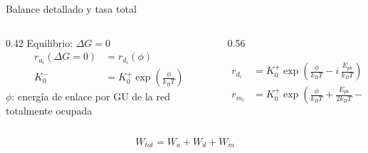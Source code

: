 \documentclass[aspectratio=169,11pt]{beamer}
\newcommand{\kB}{k_{B}}
\begin{document}
\begin{frame}{Balance detallado y tasa total}
  \begin{columns}[c,onlytextwidth]
    \begin{column}{0.42\textwidth}
      \small
      {\color{azul}Equilibrio: $\Delta G = 0$}
      \begin{align}
        r_{a_i}(\Delta G = 0) &= r_{d_i}(\phi) \tag{13}\\[0.3em]
        K_0^{-} &= K_0^{+}\exp\!\left(\frac{\phi}{\kB T}\right) \tag{14}
      \end{align}
      \vspace{0.3em}
      {\footnotesize $\phi$: energía de enlace por GU de la red totalmente ocupada}
    \end{column}
    \begin{column}{0.56\textwidth}
      \small
      \begin{block}{}
        \begin{align}
          r_{d_i} &= K_0^{+}\exp\!\left(\frac{\phi}{\kB T} - i\,\frac{E_{pb}}{\kB T}\right) \tag{15}\\[0.3em]
          r_{m_i} &= K_0^{+}\exp\!\left(\frac{\phi}{\kB T} + \frac{E_{pb}}{2\kB T} - i\,\frac{E_{pb}}{\kB T}\right) \tag{16}
        \end{align}
      \end{block}
    \end{column}
  \end{columns}
  \vspace{0.8em}
  \begin{block}{}
    \begin{equation}
      W_{tot} = W_a + W_d + W_m \tag{17}
    \end{equation}
  \end{block}
\end{frame}
\end{document}
